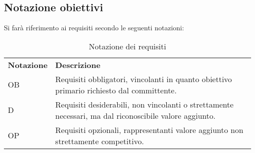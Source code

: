 \subsection{Notazione obiettivi}
Si farà riferimento ai requisiti secondo le seguenti notazioni:
\begin{longtable}{|p{}|p{}|}
	\caption{Notazione dei requisiti}
	\label{tab:notazione-requisiti} \\
	\hline
    \textbf{Notazione}	&	\textbf{Descrizione} \\
    OB			&	Requisiti obbligatori, vincolanti in quanto obiettivo primario richiesto dal committente. \\  
	\hline
    D			&	Requisiti desiderabili, non vincolanti o strettamente necessari, ma dal riconoscibile valore aggiunto. \\ 
	\hline
    OP			&	Requisiti opzionali, rappresentanti valore aggiunto non strettamente competitivo. \\
    \hline
\end{longtable}%


